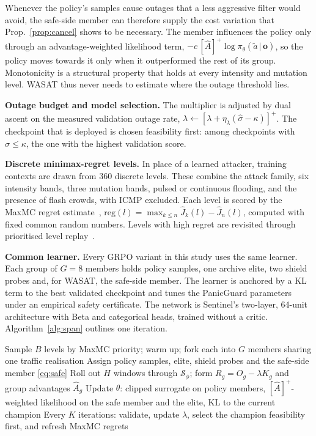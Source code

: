 \documentclass[conference]{IEEEtran}
\begin{document}
Whenever the policy's samples cause outages that a less aggressive filter would avoid, the safe-side member can therefore supply the cost variation that Prop.~\ref{prop:cancel} shows to be necessary. The member influences the policy only through an advantage-weighted likelihood term, $-c\,[\hat A]^+\log\pi_\theta(\tilde a\,|\,\mathbf{o})$, so the policy moves towards it only when it outperformed the rest of its group. Monotonicity is a structural property that holds at every intensity and mutation level. WASAT thus never needs to estimate where the outage threshold lies.

\textbf{Outage budget and model selection.} The multiplier is adjusted by dual ascent on the measured validation outage rate, $\lambda\leftarrow[\lambda+\eta_\lambda(\hat\sigma-\kappa)]^+$. The checkpoint that is deployed is chosen feasibility first: among checkpoints with $\hat\sigma\le\kappa$, the one with the highest validation score.

\textbf{Discrete minimax-regret levels.} In place of a learned attacker, training contexts are drawn from 360 discrete levels. These combine the attack family, six intensity bands, three mutation bands, pulsed or continuous flooding, and the presence of flash crowds, with ICMP excluded. Each level is scored by the MaxMC regret estimate~\cite{jiang2021robustplr}, $\mathrm{reg}(l)=\max_{k\le n}\hat J_k(l)-\hat J_n(l)$, computed with fixed common random numbers. Levels with high regret are revisited through prioritised level replay~\cite{jiang2021plr}.

\textbf{Common learner.} Every GRPO variant in this study uses the same learner. Each group of $G=8$ members holds policy samples, one archive elite, two shield probes and, for WASAT, the safe-side member. The learner is anchored by a KL term to the best validated checkpoint and tunes the PanicGuard parameters under an empirical safety certificate. The network is Sentinel's two-layer, 64-unit architecture with Beta and categorical heads, trained without a critic. Algorithm~\ref{alg:span} outlines one iteration.

\begin{algorithm}[t]
\caption{One WASAT training iteration}
\label{alg:span}
\small
\begin{algorithmic}[1]
\STATE Sample $B$ levels by MaxMC priority; warm up; fork each into $G$ members sharing one traffic realisation
\STATE Assign policy samples, elite, shield probes and the safe-side member \eqref{eq:safe}
\STATE Roll out $H$ windows through $\mathcal{S}_\phi$; form $R_g=O_g-\lambda K_g$ and group advantages $\hat A_g$
\STATE Update $\theta$: clipped surrogate on policy members, $[\hat A]^+$-weighted likelihood on the safe member and the elite, KL to the current champion
\STATE Every $K$ iterations: validate, update $\lambda$, select the champion feasibility first, and refresh MaxMC regrets
\end{algorithmic}
\end{algorithm}
\end{document}
